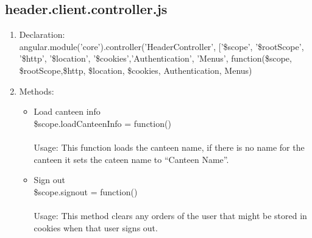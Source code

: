 \documentclass[a4paper,12pt]{report}
\begin{document}
\subsection{header.client.controller.js}
\begin{enumerate}
\item Declaration:\\ angular.module('core').controller('HeaderController', ['\$scope', '\$rootScope', '\$http', '\$location', '\$cookies','Authentication', 'Menus',
	function(\$scope, \$rootScope,\$http, \$location, \$cookies, Authentication, Menus)
	\item Methods:\\
	\begin{itemize}
	\item Load canteen info\\
	\$scope.loadCanteenInfo = function()\\ \\
	Usage: This function loads the canteen name, if there is no name for the canteen it sets the cateen name to ``Canteen Name''.
	\item Sign out\\
	\$scope.signout = function()\\ \\
	Usage: This method clears any orders of the user that might be stored in cookies when that user signs out.
	
	\end{itemize}
\end{enumerate}
\end{document}
